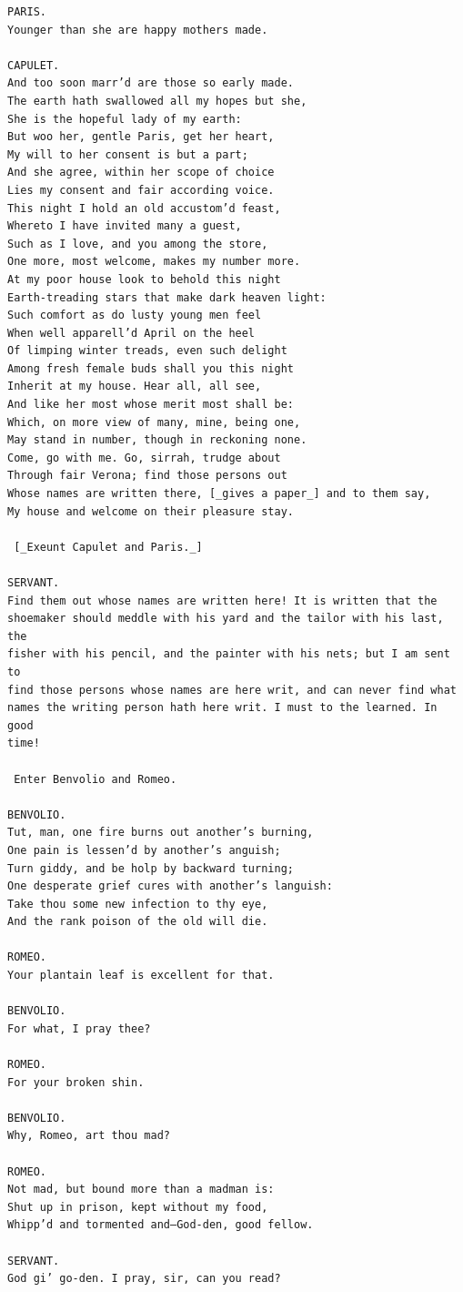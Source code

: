 \documentclass{article}
\begin{document}
\begin{verbatim}
PARIS.
Younger than she are happy mothers made.

CAPULET.
And too soon marr’d are those so early made.
The earth hath swallowed all my hopes but she,
She is the hopeful lady of my earth:
But woo her, gentle Paris, get her heart,
My will to her consent is but a part;
And she agree, within her scope of choice
Lies my consent and fair according voice.
This night I hold an old accustom’d feast,
Whereto I have invited many a guest,
Such as I love, and you among the store,
One more, most welcome, makes my number more.
At my poor house look to behold this night
Earth-treading stars that make dark heaven light:
Such comfort as do lusty young men feel
When well apparell’d April on the heel
Of limping winter treads, even such delight
Among fresh female buds shall you this night
Inherit at my house. Hear all, all see,
And like her most whose merit most shall be:
Which, on more view of many, mine, being one,
May stand in number, though in reckoning none.
Come, go with me. Go, sirrah, trudge about
Through fair Verona; find those persons out
Whose names are written there, [_gives a paper_] and to them say,
My house and welcome on their pleasure stay.

 [_Exeunt Capulet and Paris._]

SERVANT.
Find them out whose names are written here! It is written that the
shoemaker should meddle with his yard and the tailor with his last, the
fisher with his pencil, and the painter with his nets; but I am sent to
find those persons whose names are here writ, and can never find what
names the writing person hath here writ. I must to the learned. In good
time!

 Enter Benvolio and Romeo.

BENVOLIO.
Tut, man, one fire burns out another’s burning,
One pain is lessen’d by another’s anguish;
Turn giddy, and be holp by backward turning;
One desperate grief cures with another’s languish:
Take thou some new infection to thy eye,
And the rank poison of the old will die.

ROMEO.
Your plantain leaf is excellent for that.

BENVOLIO.
For what, I pray thee?

ROMEO.
For your broken shin.

BENVOLIO.
Why, Romeo, art thou mad?

ROMEO.
Not mad, but bound more than a madman is:
Shut up in prison, kept without my food,
Whipp’d and tormented and—God-den, good fellow.

SERVANT.
God gi’ go-den. I pray, sir, can you read?


\end{verbatim}
\end{document}
